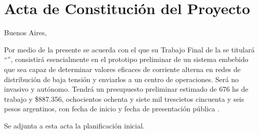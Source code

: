 \documentclass[11pt]{charter}
\begin{document}
\section{Acta de Constitución del Proyecto}
\label{sec:acta}

\begin{flushright}
Buenos Aires, \fechaInicioName
\end{flushright}

\vspace{2cm}

Por medio de la presente se acuerda con el \authorname\hspace{1px} que su Trabajo Final de la \degreename\hspace{1px} se titulará ``\ttitle'', consistirá esencialmente en el prototipo preliminar de un sistema embebido que sea capaz de determinar valores eficaces de corriente alterna en redes de distribución de baja tensión y enviarlos a un centro de operaciones. Será no invasivo y autónomo. Tendrá un presupuesto preliminar estimado de 676 hs de trabajo y \$887.356, ochocientos ochenta y siete mil trescietos cincuenta y seis pesos argentinos, con fecha de inicio \fechaInicioName\hspace{1px} y fecha de presentación pública \fechaFinalName.

Se adjunta a esta acta la planificación inicial.

\vfill
\end{document}
